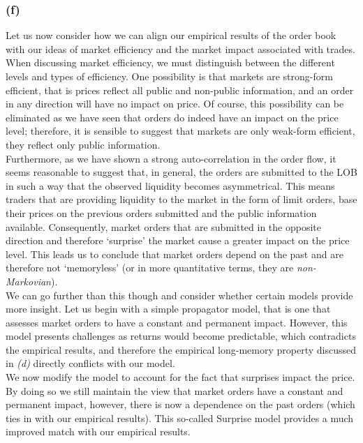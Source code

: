 \documentclass{article}
\begin{document}
\subsubsection*{(f)}
Let us now consider how we can align our empirical results of the order book with our ideas of market efficiency and the market impact associated with trades. When discussing market efficiency, we must distinguish between the different levels and types of efficiency. One possibility is that markets are strong-form efficient, that is prices reflect all public and non-public information, and an order in any direction will have no impact on price. Of course, this possibility can be eliminated as we have seen that orders do indeed have an impact on the price level; therefore, it is sensible to suggest that markets are only weak-form efficient, they reflect only public information. \\

Furthermore, as we have shown a strong auto-correlation in the order flow, it seems reasonable to suggest that, in general, the orders are submitted to the LOB in such a way that the observed liquidity becomes asymmetrical. This means traders that are providing liquidity to the market in the form of limit orders, base their prices on the previous orders submitted and the public information available. Consequently, market orders that are submitted in the opposite direction and therefore ‘surprise’ the market cause a greater impact on the price level. This leads us to conclude that market orders depend on the past and are therefore not ‘memoryless’ (or in more quantitative terms, they are \textit{non-Markovian}). \\

We can go further than this though and consider whether certain models provide more insight. Let us begin with a simple propagator model, that is one that assesses market orders to have a constant and permanent impact. However, this model presents challenges as returns would become predictable, which contradicts the empirical results, and therefore the empirical long-memory property discussed in \textit{(d)} directly conflicts with our model. \\

We now modify the model to account for the fact that surprises impact the price. By doing so we still maintain the view that market orders have a constant and permanent impact, however, there is now a dependence on the past orders (which ties in with our empirical results). This so-called Surprise model provides a much improved match with our empirical results. \\
\end{document}
